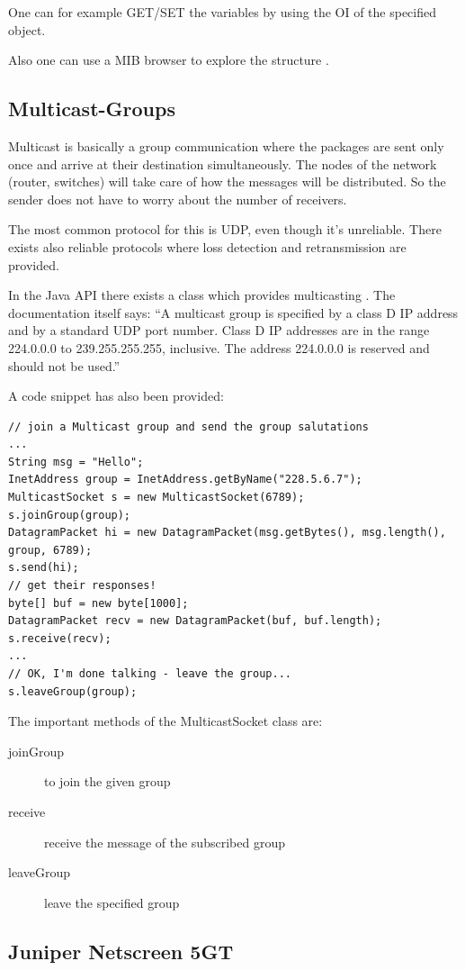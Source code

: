 \documentclass[11pt, a4paper]{article}
\begin{document}
One can for example GET/SET the variables by using the OI of the specified object.

Also one can use a MIB browser to explore the structure \cite{MIBBrowser}.
\subsection{Multicast-Groups}

Multicast is basically a group communication where the packages are sent only once and arrive at their destination simultaneously. The nodes of the network (router, switches) will take care of how the messages will be distributed. So the sender does not have to worry about the number of receivers.

The most common protocol for this is UDP, even though it’s unreliable. There exists also reliable protocols where loss detection and retransmission are provided.

In the Java API there exists a class which provides multicasting \cite{javamulticast}. The documentation itself says:
“A multicast group is specified by a class D IP address and by a standard UDP port number. Class D IP addresses are in the range 224.0.0.0 to 239.255.255.255, inclusive. The address 224.0.0.0 is reserved and should not be used.”

A code snippet has also been provided:

\begin{lstlisting}
// join a Multicast group and send the group salutations
...
String msg = "Hello";
InetAddress group = InetAddress.getByName("228.5.6.7");
MulticastSocket s = new MulticastSocket(6789);
s.joinGroup(group);
DatagramPacket hi = new DatagramPacket(msg.getBytes(), msg.length(),
group, 6789);
s.send(hi);
// get their responses!
byte[] buf = new byte[1000];
DatagramPacket recv = new DatagramPacket(buf, buf.length);
s.receive(recv);
...
// OK, I'm done talking - leave the group...
s.leaveGroup(group);
\end{lstlisting}

The important methods of the MulticastSocket class are:
\begin{description}
\item[joinGroup] to join the given group
\item[receive] receive the message of the subscribed group
\item[leaveGroup] leave the specified group
\end{description}

\subsection{Juniper Netscreen 5GT}
\end{document}
